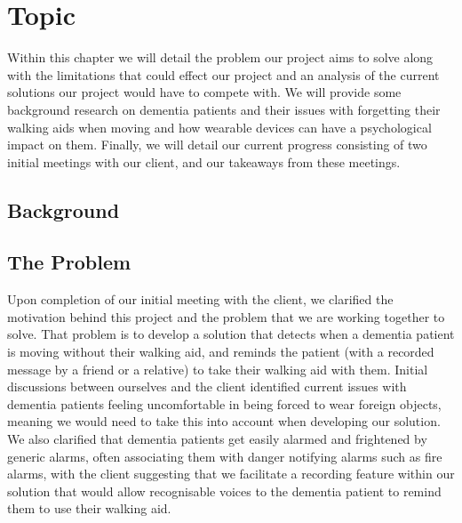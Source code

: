 \chapter{Topic}
\label{ch:topic}

Within this chapter we will detail the problem our project aims to solve along with the limitations that could effect our project and an analysis of the current solutions our project would have to compete with. We will provide some background research on dementia patients and their issues with forgetting their walking aids when moving and how wearable devices can have a psychological impact on them. Finally, we will detail our current progress consisting of two initial meetings with our client, and our takeaways from these meetings.

\section{Background}

\section{The Problem}
    Upon completion of our initial meeting with the client, we clarified the motivation behind this project and the problem that we are working together to solve. That problem is to develop a solution that detects when a dementia patient is moving without their walking aid, and reminds the patient (with a recorded message by a friend or a relative) to take their walking aid with them. Initial discussions between ourselves and the client identified current issues with dementia patients feeling uncomfortable in being forced to wear foreign objects, meaning we would need to take this into account when developing our solution. We also clarified that dementia patients get easily alarmed and frightened by generic alarms, often associating them with danger notifying alarms such as fire alarms, with the client suggesting that we facilitate a recording feature within our solution that would allow recognisable voices to the dementia patient to remind them to use their walking aid.

